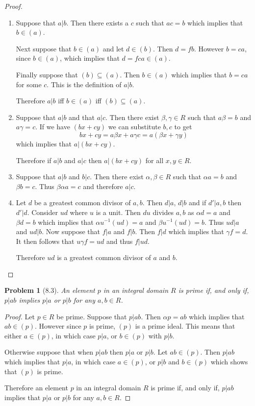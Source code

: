 \documentclass[10pt]{article}
\newcommand{\sk}{\vskip 10mm}
\theoremstyle{plain}
\newtheorem{problem}{Problem}
\theoremstyle{remark}
\begin{document}
\begin{proof}
  \begin{enumerate}
  \item Suppose that $a|b$. Then there exists a $c$ such that $ac=b$ which implies
    that $b\in (a)$.

    Next suppose that $b\in(a)$ and let $d\in (b)$. Then $d=fb$. However $b=ca$, since
    $b\in (a)$, which implies that $d=fca\in (a)$.

    Finally suppose that $(b)\subseteq (a)$. Then $b\in(a)$ which implies that $b=ca$ for
    some $c$. This is the definition of $a|b$.

    Therefore $a|b$ iff $b\in(a)$ iff $(b)\subseteq(a)$.
    
  \item Suppose that $a|b$ and that $a|c$. Then there exist $\beta,\gamma\in R$ such that
    $a\beta = b$ and $a\gamma = c$. If we have $(bx+cy)$ we can substitute $b,c$ to get
    \[ bx+cy = a\beta x + a\gamma c = a(\beta x + \gamma y)\]
    which implies that $a|(bx+cy)$.

    Therefore if $a|b$ and $a|c$ then $a|(bx+cy)$ for all $x,y\in R$.

  \item Suppose that $a|b$ and $b|c$. Then there exist $\alpha,\beta\in R$ such that
    $\alpha a = b$ and $\beta b = c$. Thus $\beta\alpha a =c$ and therefore $a|c$.

  \item Let $d$ be a greatest common divisor of $a,b$. Then
    $d|a$, $d|b$ and if $d'|a,b$ then $d'|d$. Consider $ud$ where $u$ is a unit.
    Then $du$ divides $a,b$ as $\alpha d=a$ and $\beta d=b$ which implies that
    $\alpha u^{-1}(ud) =a $ and $\beta u^{-1}(ud) = b$. Thus $ud|a$ and $ud|b$.
    Now suppose that $f|a$ and $f|b$. Then $f|d$ which implies that
    $\gamma f = d$. It then follows that $u\gamma f=ud$ and thus $f|ud$.

    Therefore $ud$ is a greatest common divisor of $a$ and $b$.
  \end{enumerate}
\end{proof}

\sk

\begin{problem}[8.3]
  An element $p$ in an integral domain $R$ is prime if, and only if,
  $p|ab$ implies $p|a$ or $p|b$ for any $a,b\in R$.
\end{problem}

\begin{proof}
  Let $p\in R$ be prime. Suppose that $p|ab$. Then $\alpha p=ab$ which implies
  that $ab\in (p)$. However since $p$ is prime, $(p)$ is a prime ideal.
  This means that either $a\in (p)$, in which case $p|a$, or $b\in (p)$ with $p|b$.

  Otherwise suppose that when $p|ab$ then $p|a$ or $p|b$. Let $ab\in (p)$. Then
  $p|ab$ which implies that $p|a$, in which case $a\in (p)$, or $p|b$ and $b\in (p)$
  which shows that $(p)$ is prime.

  Therefore an element $p$ in an integral domain $R$ is prime if, and only if,
  $p|ab$ implies that $p|a$ or $p|b$ for any $a,b\in R$.
\end{proof}
\end{document}
